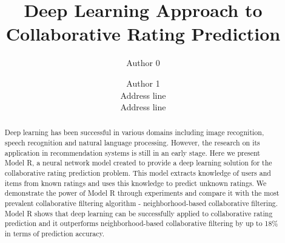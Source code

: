 \documentclass[letterpaper]{article}
\title{Deep Learning Approach to Collaborative Rating Prediction}
\author{Author 0 \and Author 1\\
	Address line\\
	Address line\\
}
\begin{document}
\maketitle

\begin{abstract}
	Deep learning has been successful in various domains 
	including image recognition, speech recognition and natural language 
	processing.
	However, the research on its application in recommendation systems is 
	still in an early stage.
	Here we present Model R, a neural network model created to provide a deep 
	learning solution for the collaborative rating prediction problem.
	This model extracts knowledge of users and items from known ratings and 
	uses this knowledge to predict unknown ratings.
	We demonstrate the power of Model R through experiments and compare it with 
	the most prevalent collaborative filtering algorithm - neighborhood-based 
	collaborative filtering.
	Model R shows that deep learning can be successfully applied to 
	collaborative rating prediction and it outperforms neighborhood-based 
	collaborative filtering by up to 18\% in terms of prediction accuracy.
\end{abstract}
\end{document}
